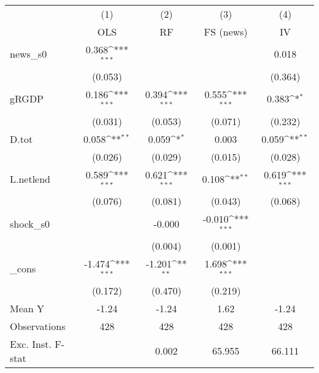 {
\def\sym#1{\ifmmode^{#1}\else\(^{#1}\)\fi}
\begin{tabular}{l*{4}{c}}
\toprule
            &\multicolumn{1}{c}{(1)}&\multicolumn{1}{c}{(2)}&\multicolumn{1}{c}{(3)}&\multicolumn{1}{c}{(4)}\\
            &\multicolumn{1}{c}{OLS}&\multicolumn{1}{c}{RF}&\multicolumn{1}{c}{FS (news)}&\multicolumn{1}{c}{IV}\\
\midrule
news\_s0     &       0.368\sym{***}&                     &                     &       0.018         \\
            &     (0.053)         &                     &                     &     (0.364)         \\
\addlinespace
gRGDP       &       0.186\sym{***}&       0.394\sym{***}&       0.555\sym{***}&       0.383\sym{*}  \\
            &     (0.031)         &     (0.053)         &     (0.071)         &     (0.232)         \\
\addlinespace
D.tot       &       0.058\sym{**} &       0.059\sym{*}  &       0.003         &       0.059\sym{**} \\
            &     (0.026)         &     (0.029)         &     (0.015)         &     (0.028)         \\
\addlinespace
L.netlend   &       0.589\sym{***}&       0.621\sym{***}&       0.108\sym{**} &       0.619\sym{***}\\
            &     (0.076)         &     (0.081)         &     (0.043)         &     (0.068)         \\
\addlinespace
shock\_s0    &                     &      -0.000         &      -0.010\sym{***}&                     \\
            &                     &     (0.004)         &     (0.001)         &                     \\
\addlinespace
\_cons      &      -1.474\sym{***}&      -1.201\sym{**} &       1.698\sym{***}&                     \\
            &     (0.172)         &     (0.470)         &     (0.219)         &                     \\
\midrule
Mean Y      &       -1.24         &       -1.24         &        1.62         &       -1.24         \\
Observations&         428         &         428         &         428         &         428         \\
Exc. Inst. F-stat&                     &       0.002         &      65.955         &      66.111         \\
\bottomrule
\end{tabular}
}
